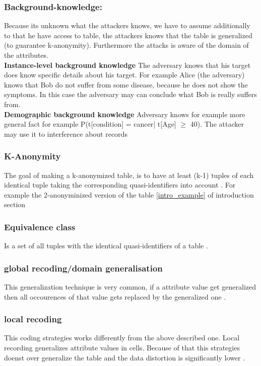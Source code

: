 \documentclass{llncs}
\begin{document}
\subsubsection{Background-knowledge:}
Because its unknown what the attackers knows, we have to assume additionally to that he have access to table, the attackers knows that the table is generalized (to guarantee k-anonymity). Furthermore the attacks is aware of the domain of the attributes.\\
\textbf{Instance-level background knowledge}
The adversary knows that his target does know specific details about his target. For example Alice (the adversary) knows that Bob do not suffer from some disease, because he does not show the symptoms. In this case the adversary may can conclude what Bob is really suffers from.\\
\textbf{Demographic background knowledge}
Adversary knows for example more general fact for example P(t[condition] = cancer| t[Age] $\geq$ 40). The attacker may use it to interference about records \cite{ldiversity}

\subsubsection{K-Anonymity}
The goal of making a k-anonymized table, is to have at least (k-1) tuples of each identical tuple taking the corresponding quasi-identifiers into account \cite{sweeney2002k,li2006achieving}. For example the 2-anonyminized version of the table \ref{intro_example} of introduction section
\subsubsection{Equivalence class}
Is a set of all tuples with the identical quasi-identifiers of a table \cite{li2006achieving}.
\subsubsection{global recoding/domain generalisation}
This generalization technique is very common, if a attribute value get generalized then all occourences of that value gets replaced by the generalized one \cite{sweeney2002k,sweeney2002achieving,li2006achieving,incognito}. 
\subsubsection{local recoding}
This coding strategies works differently from the above described one. Local recording generalizes attribute values in cells. Because of that this strategies doenst over generalize the table and the data distortion is significantly lower \cite{li2006achieving}. 
\end{document}
